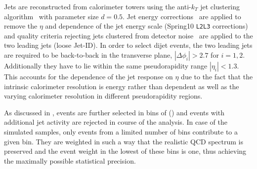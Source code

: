 Jets are reconstructed from calorimeter towers using the
anti-$k_{T}$ jet clustering algorithm~\cite{bib:akj} with parameter size \mbox{$d=0.5$}.
Jet energy corrections~\cite{bib:cmspas:jec} are applied to remove the 
$\eta$ and \pt dependence of the jet energy scale (Spring10 \texttt{L2L3} corrections) and quality criteria rejecting jets clustered from detector noise~\cite{bib:cmspas:jetid} are applied to the
two leading jets (loose Jet-ID).
In order to select dijet events, the two leading jets are required to be
back-to-back in the transverse plane, \mbox{$|\Delta\phi_{i}| > 2.7$} for \mbox{$i=1,2$}.
Additionally they have to lie within the same pseudorapidity range \mbox{$|\eta_{i}| < 1.3$}.
This accounts for the dependence of the jet \pt response on $\eta$ due to the fact that the intrinsic calorimeter resolution is energy rather than \pt dependent as well as the varying calorimeter resolution in different pseudorapidity regions.

As discussed in , events are further selected in bins of \ptave () and events with additional jet activity are rejected in course of the analysis.
In case of the simulated samples, only events from a limited number of \pthat bins contribute to a given \ptave bin.
They are weighted in such a way that the realistic QCD \pt spectrum is preserved and the event weight in the lowest of these \pthat bins is one, thus achieving the maximally possible statistical precision.
